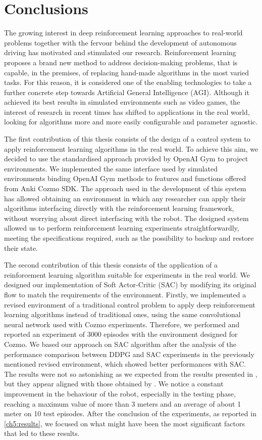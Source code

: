 \chapter{Conclusions} \label{ch:ch6}

The growing interest in deep reinforcement learning approaches to real-world problems together with the fervour behind the development of autonomous driving has motivated and stimulated our research.
Reinforcement learning proposes a brand new method to address decision-making problems, that is capable, in the premises, of replacing hand-made algorithms in the most varied tasks.
For this reason, it is considered one of the enabling technologies to take a further concrete step towards Artificial General Intelligence (AGI).
Although it achieved its best results in simulated environments such as video games, the interest of research in recent times has shifted to applications in the real world, looking for algorithms more and more easily configurable and parameter agnostic.

The first contribution of this thesis consists of the design of a control system to apply reinforcement learning algorithms in the real world.
To achieve this aim, we decided to use the standardised approach provided by OpenAI Gym to project environments.
We implemented the same interface used by simulated environments binding OpenAI Gym methods to features and functions offered from Anki Cozmo SDK.
The approach used in the development of this system has allowed obtaining an environment in which any researcher can apply their algorithms interfacing directly with the reinforcement learning framework, without worrying about direct interfacing with the robot. 
The designed system allowed us to perform reinforcement learning experiments straightforwardly, meeting the specifications required, such as the possibility to backup and restore their state.

The second contribution of this thesis consists of the application of a reinforcement learning algorithm suitable for experiments in the real world. We designed our implementation of Soft Actor-Critic (SAC) by modifying its original flow to match the requirements of the environment. Firstly, we implemented a revised environment of a traditional control problem to apply deep reinforcement learning algorithms instead of traditional ones, using the same convolutional neural network used with Cozmo experiments.
Therefore, we performed and reported an experiment of 3000 episodes with the environment designed for Cozmo.
We based our approach on SAC algorithm after the analysis of the performance comparison between DDPG and SAC experiments in the previously mentioned revised environment, which showed better performances with SAC.
The results were not so astonishing as we expected from the results presented in \cite{kendall2018learning,kendall2019learning}, but they appear aligned with those obtained by \cite{haarnoja2018alg}.
We notice a constant improvement in the behaviour of the robot, especially in the testing phase, reaching a maximum value of more than 3 meters and an average of about 1 meter on 10 test episodes.
After the conclusion of the experiments, as reported in \vref{ch5:results}, we focused on what might have been the most significant factors that led to these results.

